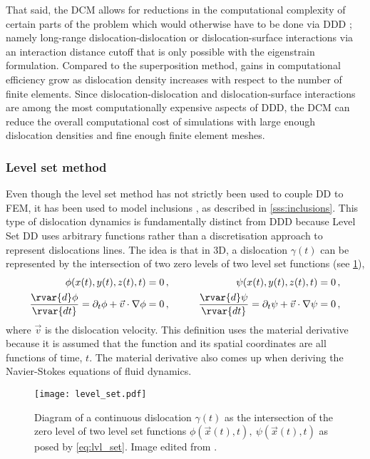 That said, the DCM allows for reductions in the computational complexity of certain parts of the problem which would otherwise have to be done via DDD \cite{dcm}; namely long-range dislocation-dislocation or dislocation-surface interactions via an interaction distance cutoff that is only possible with the eigenstrain formulation. Compared to the superposition method, gains in computational efficiency grow as dislocation density increases with respect to the number of finite elements. Since dislocation-dislocation and dislocation-surface interactions are among the most computationally expensive aspects of DDD, the DCM can reduce the overall computational cost of simulations with large enough dislocation densities and fine enough finite element meshes.

\subsubsection{Level set method}
\label{sss:lvl_set}

Even though the level set method has not strictly been used to couple DD to FEM, it has been used to model inclusions \cite{ddd_inclusion_as_force}, as described in \cref{sss:inclusions}. This type of dislocation dynamics is fundamentally distinct from DDD because Level Set DD uses arbitrary functions rather than a discretisation approach to represent dislocations lines. The idea is that in 3D, a dislocation $ \gamma(t) $ can be represented by the intersection of two zero levels of two level set functions (see \cref{f:lvl_set_dd}),
\begin{subequations}\label{eq:lvl_set}
  \begin{align}
    \phi(x(t),y(t),z(t),t)                                                          & = 0\,, & \qquad
    \psi(x(t),y(t),z(t),t)                                                          & = 0\,,          \\
    \dfrac{\rvar{d} \phi}{\rvar{dt}} = \partial_{t}\phi + \vec{v} \cdot \nabla \phi & = 0\,, & \qquad
    \dfrac{\rvar{d} \psi}{\rvar{dt}} = \partial_{t}\psi + \vec{v} \cdot \nabla \psi & = 0\,,
  \end{align}
\end{subequations}
where $ \vec{v} $ is the dislocation velocity. This definition uses the material derivative because it is assumed that the function and its spatial coordinates are all functions of time, $ t $. The material derivative also comes up when deriving the Navier-Stokes equations of fluid dynamics.
\begin{figure}
  \centering
  \texttt{[image: level\_set.pdf]}
  \caption[Level set Dislocation Dynamics.]{Diagram of a continuous dislocation $ \gamma(t) $ as the intersection of the zero level of two level set functions $ \phi(\vec{x}(t),t),~\psi(\vec{x}(t),t) $ as posed by \cref{eq:lvl_set}. Image edited from \cite{lvl_set_dd}.}
  \label{f:lvl_set_dd}
\end{figure}

